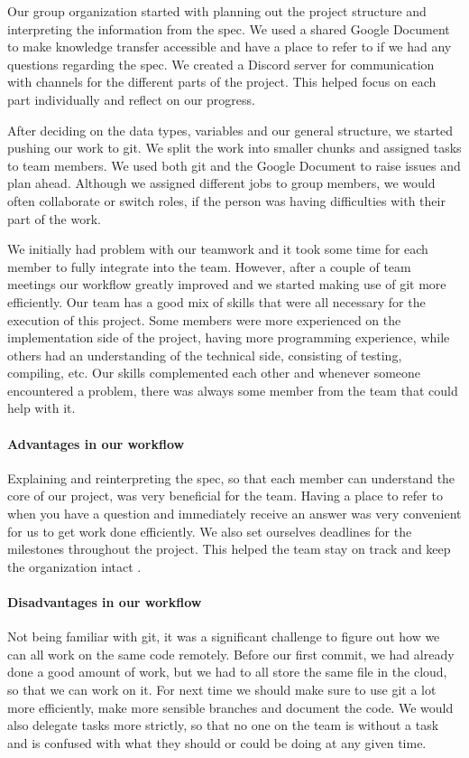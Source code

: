 \documentclass[11pt]{article}
\begin{document}
Our group organization started with planning out the project structure and interpreting the information from the spec. We used a shared Google Document to make knowledge transfer accessible and have a place to refer to if we had any questions regarding the spec. We created a Discord server for communication with channels for the different parts of the project. This helped focus on each part individually and reflect on our progress.
\par After deciding on the data types, variables and our general structure, we started pushing our work to git. We split the work into smaller chunks and assigned tasks to team members. We used both git and the Google Document to raise issues and plan ahead. Although we assigned different jobs to group members, we would often collaborate or switch roles, if the person was having difficulties with their part of the work.
\par We initially had problem with our teamwork and it took some time for each member to fully integrate into the team. However, after a couple of team meetings our workflow greatly improved and we started making use of git more efficiently. Our team has a good mix of skills that were all necessary for the execution of this project. Some members were more experienced on the implementation side of the project, having more programming experience, while others had an understanding of the technical side, consisting of testing, compiling, etc. Our skills complemented each other and whenever someone encountered a problem, there was always some member from the team that could help with it.

\paragraph{Advantages in our workflow} Explaining and reinterpreting the spec, so that each member can understand the core of our project, was very beneficial for the team. Having a place to refer to when you have a question and immediately receive an answer was very convenient for us to get work done efficiently. We also set ourselves deadlines for the milestones throughout the project. This helped the team stay on track and keep the organization intact .

\paragraph{Disadvantages in our workflow} Not being familiar with git, it was a significant challenge to figure out how we can all work on the same code remotely. Before our first commit, we had already done a good amount of work, but we had to all store the same file in the cloud, so that we can work on it. For next time we should make sure to use git a lot more efficiently, make more sensible branches and document the code. We would also delegate tasks more strictly, so that no one on the team is without a task and is confused with what they should or could be doing at any given time.
\end{document}
